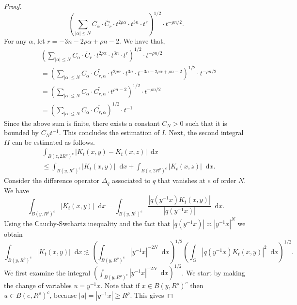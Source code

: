 \documentclass[12pt, reqno]{amsart}
\theoremstyle{definition}
\theoremstyle{remark}
\numberwithin{equation}{section}
\newcommand*\diff{\mathop{}\!\mathrm{d}}
\begin{document}
\begin{proof}
\begin{equation*}
        \left(\sum_{|\alpha|\leq N}C_\alpha \cdot \widetilde{C_r}\cdot t^{2\rho\alpha}\cdot t^{3n}\cdot t^{r}\right)^{1/2}\cdot t^{-\rho n/2}.
    \end{equation*}
    For any $\alpha$, let $r = -3n - 2\rho \alpha + \rho n - 2$. We have that,
    \begin{equation*}
        \begin{aligned}
            & \left(\sum_{|\alpha|\leq N}C_\alpha \cdot \widetilde{C_r}\cdot t^{2\rho\alpha}\cdot t^{3n}\cdot t^{r}\right)^{1/2}\cdot t^{-\rho n/2}\\
            &= \left(\sum_{|\alpha|\leq N}C_\alpha \cdot \widetilde{C_{r,\alpha}}\cdot t^{2\rho\alpha}\cdot t^{3n}\cdot t^{-3n-2\rho\alpha+\rho n-2}\right)^{1/2}\cdot t^{-\rho n/2}\\
             &= \left(\sum_{|\alpha|\leq N}C_\alpha \cdot \widetilde{C_{r,\alpha}}\cdot t^{\rho n-2}\right)^{1/2}\cdot t^{-\rho n/2}\\
             &= \left(\sum_{|\alpha|\leq N}C_\alpha \cdot \widetilde{C_{r,\alpha}}\right)^{1/2}\cdot t^{-1}
        \end{aligned}
    \end{equation*}
    Since the above sum is finite, there exists a constant $C_N>0$ such that it is bounded by $C_N t^{-1}$. This concludes the estimation of $I$. Next, the second integral $II$ can be estimated as follows. 
\begin{equation*}
\begin{aligned}
    &\int_{B(z, 2R^\rho)^c}|K_t(x,y)-K_t(x,z)|\diff{x}\\
       &\leq\int_{B(y,R^\rho)^c}|K_t(x,y)|\diff{x}+\int_{B(z, 2R^\rho)^c}|K_t(x,z)|\diff{x}.
\end{aligned}
\end{equation*}
Consider the difference operator $\Delta_q$ associated to $q$ that vanishes at $e$ of order $N$. We have
  \begin{equation*}
      \int_{B(y,R^\rho)^c}|K_t(x,y)|\diff{x}=\int_{B(y,R^\rho)^c}\frac{|q(y^{-1}x)K_t(x,y)|}{|q(y^{-1}x)|}\diff{x}.
  \end{equation*}
  Using the Cauchy-Swchartz inequality and the fact that $|q(y^{-1}x)|\asymp|y^{-1}x|^N$ we obtain
  \begin{equation*}
      \int_{B(y,R^\rho)^c}|K_t(x,y)|\diff{x}\lesssim\left(\int_{B(y,R^\rho)^c}|y^{-1}x|^{-2N}\diff{x}\right)^{1/2}\left(\int_{G}|q(y^{-1}x)K_t(x,y)|^2\diff{x}\right)^{1/2}.
  \end{equation*}
  We first examine the integral $\left(\int_{B(y,R^\rho)^c}|y^{-1}x|^{-2N}\diff{x}\right)^{1/2}$. We start by making the change of variables $u=y^{-1}x$. Note that if $x\in B(y,R^\rho)^c$ then $u\in B(e,R^\rho)^c$, because $|u|=|y^{-1}x|\geq R^\rho$. This gives

\end{proof}
\end{document}
